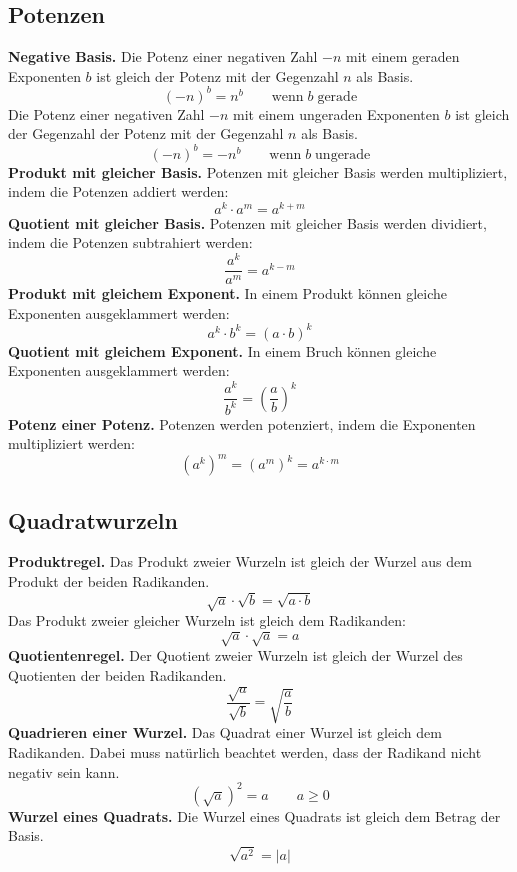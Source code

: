 \subsection{Potenzen}

\textbf{Negative Basis.} Die Potenz einer negativen Zahl $-n$ mit einem geraden Exponenten $b$ ist gleich der Potenz mit der Gegenzahl $n$ als Basis.
\[
  (-n)^{b} = n^{b} \qquad \text{wenn}\;b\;\text{gerade}
\]
Die Potenz einer negativen Zahl $-n$ mit einem ungeraden Exponenten $b$ ist gleich der Gegenzahl der Potenz mit der Gegenzahl $n$ als Basis.
\[
  (-n)^{b} = -n^{b} \qquad \text{wenn}\;b\;\text{ungerade}
\]
\textbf{Produkt mit gleicher Basis.} Potenzen mit gleicher Basis werden multipliziert, indem die Potenzen addiert werden:
\[
  a^{k} \cdot a^{m} = a^{k+m}
\]
\textbf{Quotient mit gleicher Basis.} Potenzen mit gleicher Basis werden dividiert, indem die Potenzen subtrahiert werden:
\[
  \frac{a^{k}}{a^{m}} = a^{k-m}
\]
\textbf{Produkt mit gleichem Exponent.} In einem Produkt können gleiche Exponenten ausgeklammert werden:
\[
  a^{k}\cdot b^{k} = (a\cdot b)^{k}
\]
\textbf{Quotient mit gleichem Exponent.} In einem Bruch können gleiche Exponenten ausgeklammert werden:
\[
  \frac{a^{k}}{b^{k}} = \left(\frac{a}{b}\right)^{k}
\]
\textbf{Potenz einer Potenz.} Potenzen werden potenziert, indem die Exponenten multipliziert werden:
\[
  \left(a^{k}\right)^{m} = \left(a^{m}\right)^{k}= a^{k\cdot m}
\]

\subsection{Quadratwurzeln}

\textbf{Produktregel.} Das Produkt zweier Wurzeln ist gleich der Wurzel aus dem Produkt der beiden Radikanden.
\[
  \sqrt{a}\cdot\sqrt{b} = \sqrt{a\cdot b}
\]
Das Produkt zweier gleicher Wurzeln ist gleich dem Radikanden:
\[
  \sqrt{a}\cdot\sqrt{a} = a
\]
\textbf{Quotientenregel.} Der Quotient zweier Wurzeln ist gleich der Wurzel des Quotienten der beiden Radikanden.
\[
  \frac{\sqrt{a}}{\sqrt{b}} = \sqrt{\frac{a}{b}}
\]
\textbf{Quadrieren einer Wurzel.} Das Quadrat einer Wurzel ist gleich dem Radikanden. Dabei muss natürlich beachtet werden, dass der Radikand nicht negativ sein kann.
\[
  \left(\sqrt{a}\right)^{2} = a \qquad a\ge 0
\]
\textbf{Wurzel eines Quadrats.} Die Wurzel eines Quadrats ist gleich dem Betrag der Basis.
\[
  \sqrt{a^{2}} = |a|
\]
